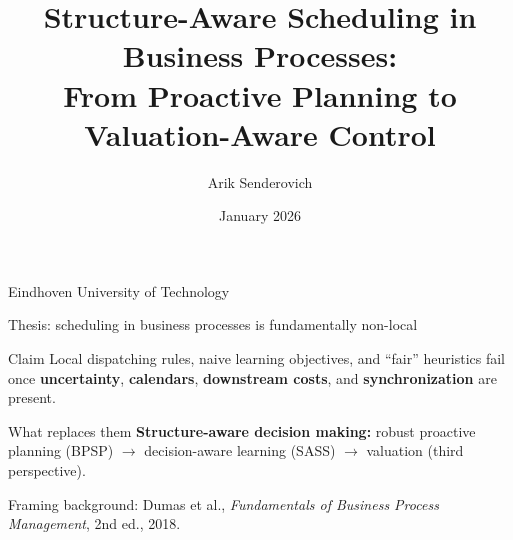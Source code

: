 \documentclass[aspectratio=169,10pt]{beamer}
\title[Structure-Aware BPO Scheduling]{Structure-Aware Scheduling in Business Processes:\\From Proactive Planning to Valuation-Aware Control}
\author[Arik Senderovich]{Arik Senderovich}
\institute[York University]{York University}
\date{January 2026}
\newif\iflong
\newcommand{\btext}[1]{\textbf{\color{darkred}#1}}
\newcommand{\smallref}[1]{{\scriptsize\color{darkgray}#1}}
\begin{document}
\begin{frame}
  \titlepage
  \vspace{-0.25cm}
  \begin{center}\small\color{darkgray}
    \iflong
      Technical University of Munich
    \else
      Eindhoven University of Technology
    \fi
  \end{center}
\end{frame}

\begin{frame}{Thesis: scheduling in business processes is fundamentally non-local}
  \begin{block}{Claim}
    Local dispatching rules, naive learning objectives, and ``fair'' heuristics fail once
    \btext{uncertainty}, \btext{calendars}, \btext{downstream costs}, and \btext{synchronization} are present.
  \end{block}
  \vspace{0.15cm}
  \begin{block}{What replaces them}
    \btext{Structure-aware decision making:}
    robust proactive planning (BPSP) \(\rightarrow\) decision-aware learning (SASS) \(\rightarrow\)
    \iflong valuation \& incentives (capstone).\else valuation (third perspective).\fi
  \end{block}
  \vspace{0.2cm}
  \smallref{Framing background: Dumas et al., \emph{Fundamentals of Business Process Management}, 2nd ed., 2018.}
\end{frame}
\end{document}
